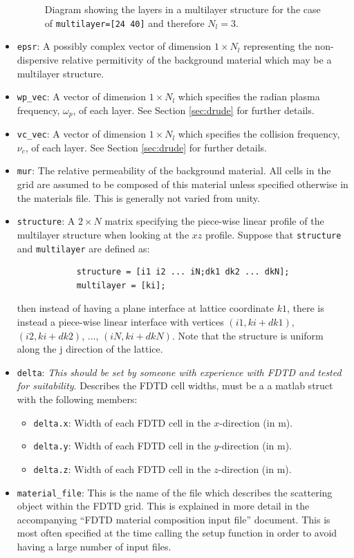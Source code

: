 \documentclass[a4paper, 12pt]{article}
\begin{document}
\begin{itemize}
\begin{figure}[h]
\begin{center}
				\caption{Diagram showing the layers in a multilayer structure for the
					case of \texttt{multilayer=[24 40]} and therefore $N_l =3$.}
				\label{fig:multilayer}
			\end{center}
		\end{figure}
		\item \verb+epsr+: A  possibly complex vector of dimension $1\times
		N_l$ representing the non-dispersive relative permitivity of the background
		material which may be a multilayer structure.
		\item \verb+wp_vec+: A vector of dimension $1\times N_l$ which
		specifies the radian plasma frequency, $\omega_p$, of each
		layer. See Section \ref{sec:drude} for further details.
		\item \verb+vc_vec+: A vector of dimension $1\times N_l$ which
		specifies the collision frequency, $\nu_c$, of each layer. See
		Section \ref{sec:drude} for further details.

		\item \verb+mur+: The relative permeability of the background
		material. All cells in the grid are assumed to be composed of this
		material unless specified otherwise in the materials file. This is
		generally not varied from unity.
		\item \verb+structure+: A $2\times N$ matrix specifying the piece-wise
		linear profile of the multilayer structure when looking at the $xz$
		profile. Suppose that \verb+structure+ and \verb+multilayer+ are defined as:
		\begin{verbatim}
			structure = [i1 i2 ... iN;dk1 dk2 ... dkN];
			multilayer = [ki];
		\end{verbatim}
		then instead of having a plane interface at lattice coordinate $k1$,
		there is instead a piece-wise linear interface with vertices
		$(i1,ki+dk1)$, $(i2,ki+dk2)$, ..., $(iN,ki+dkN)$. Note that the
		structure is uniform along the j direction of the lattice.
		\item \verb+delta+: \emph{This should be set by someone with
			experience with FDTD and tested for suitability}. Describes the FDTD cell widths, must be a a matlab struct with the following members:
		\begin{itemize}
			\item \verb+delta.x+: Width of each FDTD cell in the $x$-direction
			(in m).
			\item \verb+delta.y+: Width of each FDTD cell in the $y$-direction
			(in m).
			\item \verb+delta.z+: Width of each FDTD cell in the $z$-direction
			(in m).
		\end{itemize}

		\item \verb+material_file+: This is the name of the file which
		describes the scattering object within the FDTD grid. This is
		explained in more detail in the accompanying ``FDTD
		material composition input file'' document. This is most often
		specified at the time calling the setup function in order to avoid
		having a large number of input files.
	\end{itemize}
\end{document}
